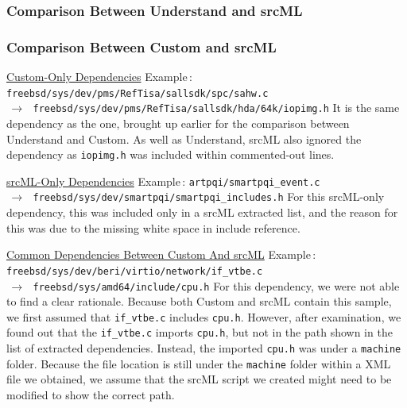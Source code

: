 \documentclass[12pt, dvipsnames, a4paper]{article}
\begin{document}
\subsubsection{Comparison Between Understand and srcML}

\subsubsection{Comparison Between Custom and srcML}
\underline{Custom-Only Dependencies}
\newline
\newline
Example$\,\colon\,$\texttt{freebsd/sys/dev/pms/RefTisa/sallsdk/spc/sahw.c \\$\,\to\,$ freebsd/sys/dev/pms/RefTisa/sallsdk/hda/64k/iopimg.h}
\newline
\newline
It is the same dependency as the one, brought up earlier for the comparison between Understand and Custom. As well as Understand, srcML also ignored the dependency as \texttt{iopimg.h} was included within commented-out lines. 

\underline{srcML-Only Dependencies}
\newline
\newline
Example$\,\colon\,$\texttt{artpqi/smartpqi\_event.c \\$\,\to\,$ freebsd/sys/dev/smartpqi/smartpqi\_includes.h}
\newline
\newline
For this srcML-only dependency, this was included only in a srcML extracted list, and the reason for this was due to the missing white space in include reference.

\underline{Common Dependencies Between Custom And srcML}
\newline
\newline
Example$\,\colon\,$\texttt{freebsd/sys/dev/beri/virtio/network/if\_vtbe.c \\$\,\to\,$ freebsd/sys/amd64/include/cpu.h}
\newline
\newline
For this dependency, we were not able to find a clear rationale. Because both Custom and srcML contain this sample, we first assumed that \texttt{if\_vtbe.c} includes \texttt{cpu.h}. However, after examination, we found out that the \texttt{if\_vtbe.c} imports \texttt{cpu.h}, but not in the path shown in the list of extracted dependencies. Instead, the imported \texttt{cpu.h} was under a \texttt{machine} folder. 
Because the file location is still under the \texttt{machine} folder within a XML file we obtained, we assume that the srcML script we created might need to be modified to show the correct path.
\end{document}
